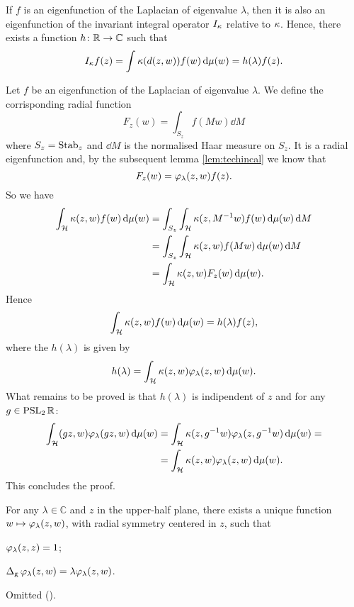 \begin{nprop}
\label{prop:eig_Lapl_is_eig_operator}
If $f$ is an eigenfunction of the Laplacian of eigenvalue $\lambda$, then it is also an eigenfunction of the invariant integral operator $I_{\kappa}$ relative to $\kappa$. Hence, there exists a function $h\colon\mathbb{R}\to\mathbb{C}$ such that 
\[
I_{\kappa}f(z)=\int\kappa(d(z,w))f(w)\mathop{}\!\mathrm{d}\mu(w)=h(\lambda)f(z).
\]
\end{nprop}
\begin{prf}
Let $f$ be an eigenfunction of the Laplacian of eigenvalue $\lambda$. We define the corrisponding radial function 
\[
F_{z}(w)=\int_{S_{z}}f(Mw)\dd M
\]
where $S_{z}=\operatorname{Stab}_{z}$ and $\dd M$ is the normalised Haar measure on $S_{z}$. It is a radial eigenfunction and, by the subsequent lemma \ref{lem:techincal} we know that
\[
F_{z}(w)=\varphi_{\lambda}(z,w)f(z).
\]
So we have
\begin{align*}
\int_{\mathcal{H}}\kappa(z,w)f(w)\mathop{}\!\mathrm{d}\mu(w)&=\int_{S_{z}}\int_{\mathcal{H}}\kappa(z,M^{-1}w)f(w)\mathop{}\!\mathrm{d}\mu(w)\mathop{}\!\mathrm{d} M\\
&=\int_{S_{z}}\int_{\mathcal{H}}\kappa(z,w)f(Mw)\mathop{}\!\mathrm{d}\mu(w)\mathop{}\!\mathrm{d} M\\
&=\int_{\mathcal{H}}\kappa(z,w)F_{z}(w)\mathop{}\!\mathrm{d}\mu(w).
\end{align*}
Hence
\[
\int_{\mathcal{H}}\kappa(z,w)f(w)\mathop{}\!\mathrm{d}\mu(w)=h(\lambda)f(z),
\]
where the  $h(\lambda)$ is given by
\[
h(\lambda)=\int_{\mathcal{H}}\kappa(z,w)\varphi_{\lambda}(z,w)\mathop{}\!\mathrm{d}\mu(w).
\]
What remains to be proved is that $h(\lambda)$ is indipendent of $z$ and for any $g\in\operatorname{PSL}_{2}\mathbb{R}$:
\begin{align*}
\int_{\mathcal{H}}(gz,w)\varphi_{\lambda}(gz,w)\mathop{}\!\mathrm{d}\mu(w)&=\int_{\mathcal{H}}\kappa(z,g^{-1}w)\varphi_{\lambda}(z,g^{-1}w)\mathop{}\!\mathrm{d}\mu(w)=\\
&=\int_{\mathcal{H}}\kappa(z,w)\varphi_{\lambda}(z,w)\mathop{}\!\mathrm{d}\mu(w).
\end{align*}
This concludes the proof.
\end{prf}


\begin{nlem}
\label{lem:techincal}
For any $\lambda\in\mathbb{C}$ and $z$ in the upper-half plane, there exists a unique function $w\mapsto\varphi_{\lambda}(z,w)$, with radial symmetry centered in $z$, such that
\begin{compactenum}
\item $\varphi_{\lambda}(z,z)=1$;
\item $\operatorname{\Delta}_{\mathrm{g}}\varphi_{\lambda}(z,w)=\lambda\varphi_{\lambda}(z,w)$.
\end{compactenum} 
\end{nlem}
\begin{prf}
Omitted (\cite{Masson:aque_everything}).
\end{prf}

